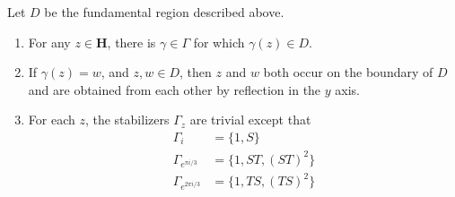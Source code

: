 \begin{theorem}
    Let $D$ be the fundamental region described above.
    \begin{enumerate}
        \item For any $z \in \mathbf{H}$, there is $\gamma \in \Gamma$ for which $\gamma(z) \in D$.
        \item If $\gamma(z) = w$, and $z,w \in D$, then $z$ and $w$ both occur on the boundary of $D$ and are obtained from each other by reflection in the $y$ axis.
        \item For each $z$, the stabilizers $\Gamma_z$ are trivial except that
        \begin{align*}
            \Gamma_i &= \{ 1, S \}\\
            \Gamma_{e^{\pi i/3}} &= \{ 1, ST, (ST)^2 \}\\
            \Gamma_{e^{2 \pi i/3}} &= \{ 1, TS, (TS)^2 \}
        \end{align*}
    \end{enumerate}
\end{theorem}

